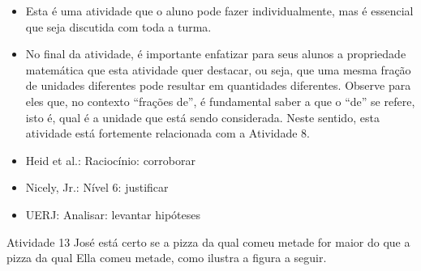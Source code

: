 \begin{multicols}{2}
  \vspace{.1cm}

  \vspace{.1cm}

  \begin{itemize} %
    \item       Esta é uma atividade que o aluno pode fazer individualmente, mas é essencial que seja discutida com toda a turma.
    \item       No final da atividade, é importante enfatizar para seus alunos a propriedade matemática que esta atividade quer destacar, ou seja, que uma mesma fração de unidades diferentes pode resultar em quantidades diferentes. Observe para eles que, no contexto       ``frações de'', é fundamental saber a que o       ``de''     se refere, isto é, qual é a unidade que está sendo considerada. Neste sentido, esta atividade está fortemente relacionada com a Atividade 8.
\end{itemize} %


  \vspace{.1cm}

 \vspace{.1cm}
\begin{itemize} %
    \item       Heid et al.: Raciocínio: corroborar
    \item       Nicely, Jr.: Nível 6: justificar
    \item       UERJ: Analisar: levantar hipóteses
\end{itemize} %


\begin{resposta*}{Atividade 13}
  José está certo se a pizza da qual comeu metade for maior do que a pizza da qual Ella comeu metade, como ilustra a figura a seguir.
  \begin{center}


\end{center}
\end{resposta*}
\end{multicols}

